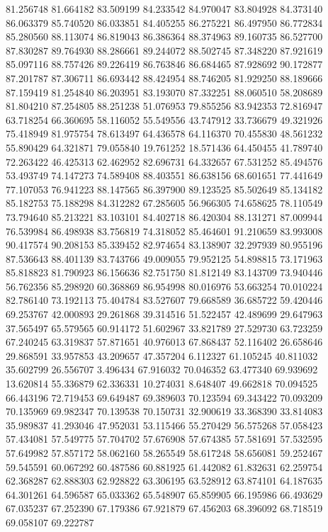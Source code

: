 81.256748
81.664182
83.509199
84.233542
84.970047
83.804928
84.373140
86.063379
85.740520
86.033851
84.405255
86.275221
86.497950
86.772834
85.280560
88.113074
86.819043
86.386364
88.374963
89.160735
86.527700
87.830287
89.764930
88.286661
89.244072
88.502745
87.348220
87.921619
85.097116
88.757426
89.226419
86.763846
86.684465
87.928692
90.172877
87.201787
87.306711
86.693442
88.424954
88.746205
81.929250
88.189666
87.159419
81.254840
86.203951
83.193070
87.332251
88.060510
58.208689
81.804210
87.254805
88.251238
51.076953
79.855256
83.942353
72.816947
63.718254
66.360695
58.116052
55.549556
43.747912
33.736679
49.321926
75.418949
81.975754
78.613497
64.436578
64.116370
70.455830
48.561232
55.890429
64.321871
79.055840
19.761252
18.571436
64.450455
41.789740
72.263422
46.425313
62.462952
82.696731
64.332657
67.531252
85.494576
53.493749
74.147273
74.589408
88.403551
86.638156
68.601651
77.441649
77.107053
76.941223
88.147565
86.397900
89.123525
85.502649
85.134182
85.182753
75.188298
84.312282
67.285605
56.966305
74.658625
78.110549
73.794640
85.213221
83.103101
84.402718
86.420304
88.131271
87.009944
76.539984
86.498938
83.756819
74.318052
85.464601
91.210659
83.993008
90.417574
90.208153
85.339452
82.974654
83.138907
32.297939
80.955196
87.536643
88.401139
83.743766
49.009055
79.952125
54.898815
73.171963
85.818823
81.790923
86.156636
82.751750
81.812149
83.143709
73.940446
56.762356
85.298920
60.368869
86.954998
80.016976
53.663254
70.010224
82.786140
73.192113
75.404784
83.527607
79.668589
36.685722
59.420446
69.253767
42.000893
29.261868
39.314516
51.522457
42.489699
29.647963
37.565497
65.579565
60.914172
51.602967
33.821789
27.529730
63.723259
67.240245
63.319837
57.871651
40.976013
67.868437
52.116402
26.658646
29.868591
33.957853
43.209657
47.357204
6.112327
61.105245
40.811032
35.602799
26.556707
3.496434
67.916032
70.046352
63.477340
69.939692
13.620814
55.336879
62.336331
10.274031
8.648407
49.662818
70.094525
66.443196
72.719453
69.649487
69.389603
70.123594
69.343422
70.093209
70.135969
69.982347
70.139538
70.150731
32.900619
33.368390
33.814083
35.989837
41.293046
47.952031
53.115466
55.270429
56.575268
57.058423
57.434081
57.549775
57.704702
57.676908
57.674385
57.581691
57.532595
57.649982
57.857172
58.062160
58.265549
58.617248
58.656081
59.252467
59.545591
60.067292
60.487586
60.881925
61.442082
61.832631
62.259754
62.368287
62.888303
62.928822
63.306195
63.528912
63.874101
64.187635
64.301261
64.596587
65.033362
65.548907
65.859905
66.195986
66.493629
67.035237
67.252390
67.179386
67.921879
67.456203
68.396092
68.718519
69.058107
69.222787
